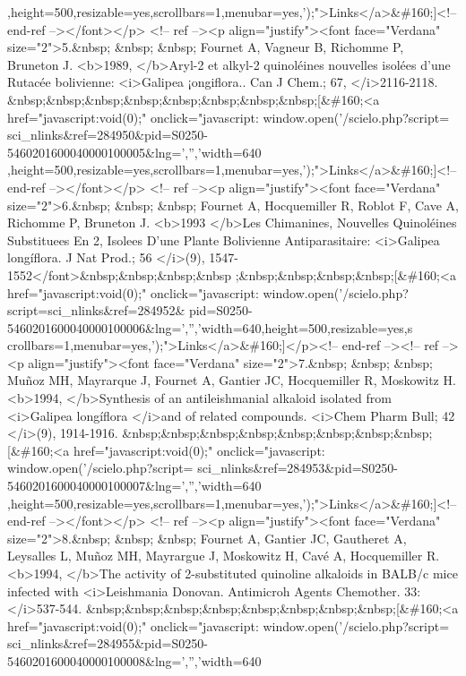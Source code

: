 ,height=500,resizable=yes,scrollbars=1,menubar=yes,');">Links</a>\&\#160;]<!--
end-ref --></font></p> <!-- ref --><p align="justify"><font face="Verdana"
size="2">5.\&nbsp; \&nbsp; \&nbsp; Fournet A, Vagneur B, Richomme P, Bruneton J.
<b>1989, </b>Aryl-2 et alkyl-2 quinoléines nouvelles isolées d'une Rutacée
bolivienne: <i>Galipea ¡ongiflora.. Can J Chem.; 67, </i>2116-2118.
\&nbsp;\&nbsp;\&nbsp;\&nbsp;\&nbsp;\&nbsp;\&nbsp;\&nbsp;[\&\#160;<a
href="javascript:void(0);" onclick="javascript: window.open('/scielo.php?script=
sci\_{}nlinks\&ref=284950\&pid=S0250-5460201600040000100005\&lng=','','width=640
,height=500,resizable=yes,scrollbars=1,menubar=yes,');">Links</a>\&\#160;]<!--
end-ref --></font></p> <!-- ref --><p align="justify"><font face="Verdana"
size="2">6.\&nbsp; \&nbsp; \&nbsp; Fournet A, Hocquemiller R, Roblot F, Cave A,
Richomme P, Bruneton J. <b>1993 </b>Les Chimanines, Nouvelles Quinoléines
Substituees En 2, Isolees D'une Plante Bolivienne Antiparasitaire: <i>Galipea
longíflora. J Nat Prod.; 56 </i>(9), 1547-1552</font>\&nbsp;\&nbsp;\&nbsp;\&nbsp
;\&nbsp;\&nbsp;\&nbsp;\&nbsp;[\&\#160;<a href="javascript:void(0);"
onclick="javascript: window.open('/scielo.php?script=sci\_{}nlinks\&ref=284952\&
pid=S0250-5460201600040000100006\&lng=','','width=640,height=500,resizable=yes,s
crollbars=1,menubar=yes,');">Links</a>\&\#160;]</p><!-- end-ref --><!-- ref
--><p align="justify"><font face="Verdana" size="2">7.\&nbsp; \&nbsp; \&nbsp;
Muñoz MH, Mayrarque J, Fournet A, Gantier JC, Hocquemiller R, Moskowitz H.
<b>1994, </b>Synthesis of an antileishmanial alkaloid isolated from <i>Galipea
longíflora </i>and of related compounds. <i>Chem Pharm Bull; 42 </i>(9),
1914-1916. \&nbsp;\&nbsp;\&nbsp;\&nbsp;\&nbsp;\&nbsp;\&nbsp;\&nbsp;[\&\#160;<a
href="javascript:void(0);" onclick="javascript: window.open('/scielo.php?script=
sci\_{}nlinks\&ref=284953\&pid=S0250-5460201600040000100007\&lng=','','width=640
,height=500,resizable=yes,scrollbars=1,menubar=yes,');">Links</a>\&\#160;]<!--
end-ref --></font></p> <!-- ref --><p align="justify"><font face="Verdana"
size="2">8.\&nbsp; \&nbsp; \&nbsp; Fournet A, Gantier JC, Gautheret A, Leysalles
L, Muñoz MH, Mayrargue J, Moskowitz H, Cavé A, Hocquemiller R. <b>1994, </b>The
activity of 2-substituted quinoline alkaloids in BALB/c mice infected with
<i>Leishmania Donovan. Antimicroh Agents Chemother. 33: </i>537-544.
\&nbsp;\&nbsp;\&nbsp;\&nbsp;\&nbsp;\&nbsp;\&nbsp;\&nbsp;[\&\#160;<a
href="javascript:void(0);" onclick="javascript: window.open('/scielo.php?script=
sci\_{}nlinks\&ref=284955\&pid=S0250-5460201600040000100008\&lng=','','width=640
